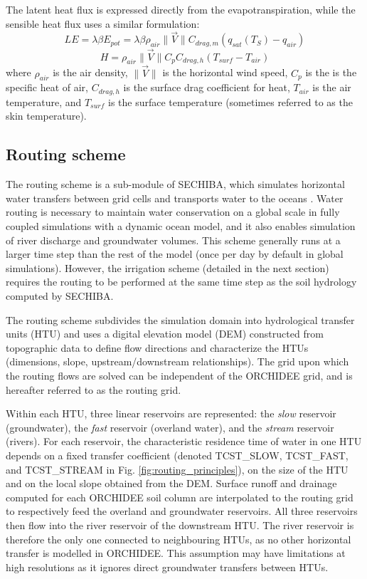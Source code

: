 The latent heat flux is expressed directly from the evapotranspiration, while the sensible heat flux uses a similar formulation:
\begin{equation}
    LE = \lambda \beta E_{pot} = \lambda \beta \rho_{air} \lVert \vec{V} \rVert C_{drag, m} (q_{sat}(T_S) - q_{air})
\end{equation}
\begin{equation}
    H = \rho_{air}  \lVert \vec{V} \rVert C_p C_{drag, h} (T_{surf} - T_{air})
\end{equation}
where $\rho_{air}$ is the air density, $\lVert \vec{V} \rVert$ is the horizontal wind speed, $C_p$ is the is the specific heat of air, $C_{drag, h}$ is the surface drag coefficient for heat, $T_{air}$ is the air temperature, and $T_{surf}$ is the surface temperature (sometimes referred to as the skin temperature).

\subsection{Routing scheme}
\label{section:routing_methods}
The routing scheme is a sub-module of SECHIBA, which simulates horizontal water transfers between grid cells and transports water to the oceans \citep{ducharne_development_2003, ngo-duc_validation_2007}. 
Water routing is necessary to maintain water conservation on a global scale in fully coupled simulations with a dynamic ocean model, and it also enables simulation of river discharge and groundwater volumes. 
This scheme generally runs at a larger time step than the rest of the model (once per day by default in global simulations). However, the irrigation scheme (detailed in the next section) requires the routing to be performed at the same time step as the soil hydrology computed by SECHIBA. 

The routing scheme subdivides the simulation domain into hydrological transfer units (HTU) and uses a digital elevation model (DEM) constructed from topographic data to define flow directions and characterize the HTUs (dimensions, slope, upstream/downstream relationships). The grid upon which the routing flows are solved can be independent of the ORCHIDEE grid, and is hereafter referred to as the routing grid.

Within each HTU, three linear reservoirs are represented: the \textit{slow} reservoir (groundwater), the \textit{fast} reservoir (overland water), and the \textit{stream} reservoir (rivers). For each reservoir, the characteristic residence time of water in one HTU depends on a fixed transfer coefficient (denoted TCST\_SLOW, TCST\_FAST, and TCST\_STREAM in Fig. \ref{fig:routing_principles}), on the size of the HTU and on the local slope obtained from the DEM.
Surface runoff and drainage computed for each ORCHIDEE soil column are interpolated to the routing grid to respectively feed the overland and groundwater reservoirs. All three reservoirs then flow into the river reservoir of the downstream HTU. The river reservoir is therefore the only one connected to neighbouring HTUs, as no other horizontal transfer is modelled in ORCHIDEE. This assumption may have limitations at high resolutions as it ignores direct groundwater transfers between HTUs.


